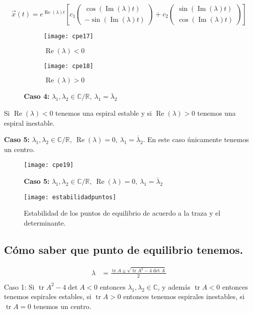 $$
\vec{x}(t) = e^{\operatorname{Re}(\lambda)t} \left[ c_1 \begin{pmatrix} \cos(\operatorname{Im}(\lambda)t) \\ -\sin(\operatorname{Im}(\lambda)t) \end{pmatrix} + c_2 \begin{pmatrix} \sin(\operatorname{Im} (\lambda)t) \\ \cos(\operatorname{Im}(\lambda)t) \end{pmatrix}   \right]   
$$
\begin{figure}[!tbp]
  \begin{subfigure}[b]{0.49\textwidth}
    \texttt{[image: cpe17]}
    \caption{$\operatorname{Re}(\lambda)<0$}
  \end{subfigure}
  \hfill
  \begin{subfigure}[b]{0.49\textwidth}
    \texttt{[image: cpe18]}
    \caption{$\operatorname{Re}(\lambda)>0$}
  \end{subfigure}
  \caption{\textbf{Caso 4:} $\lambda_1,\lambda_2 \in \mathbb{C}/\mathbb{R},\ \lambda_1=\overline{\lambda}_2$}
\end{figure}

Si $\operatorname{Re}(\lambda)<0$ tenemos una espiral estable y si $\operatorname{Re}(\lambda)>0$ tenemos una espiral inestable.

\textbf{Caso 5:} $\lambda_1, \lambda_2 \in \mathbb{C}/\mathbb{R},\ \operatorname{Re}(\lambda)=0,\ \lambda_1=\overline{\lambda}_2$. En este caso únicamente tenemos un centro.

\begin{figure}[h]
  \centering
  \texttt{[image: cpe19]}
  \caption{\textbf{Caso 5:} $\lambda_1, \lambda_2 \in \mathbb{C}/\mathbb{R},\ \operatorname{Re}(\lambda)=0,\ \lambda_1=\overline{\lambda}_2$}
\end{figure}

\begin{figure}[H]
  \centering
  \texttt{[image: estabilidadpuntos]}
  \caption{Estabilidad de los puntos de equilibrio de acuerdo a la traza y el determinante.}
\end{figure}

\subsection{Cómo saber que punto de equilibrio tenemos.}
$$
\begin{aligned}
  \lambda &= \frac{ \operatorname{tr}A \pm \sqrt{\operatorname{tr}A^2-4\operatorname{det}A}}{2} \\  
\end{aligned}
$$
Caso 1: Si $\operatorname{tr}A^2 - 4\operatorname{det}A<0$ entonces $\lambda_1, \lambda_2 \in  \mathbb{C}$, y además $\operatorname{tr}A<0$ entonces tenemos espirales estables, si $\operatorname{tr}A>0$ entonces tenemos espirales inestables, si $\operatorname{tr}A=0$ tenemos un centro.

